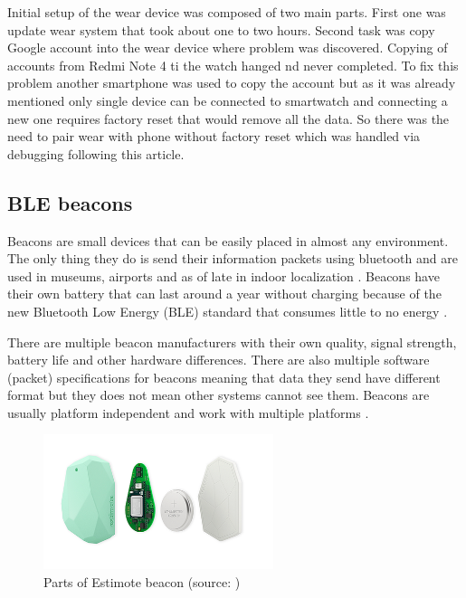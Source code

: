 Initial setup of the wear device was composed of two main parts. First one was update wear system that took about one to two hours. Second task was copy Google account into the wear device where problem was discovered. Copying of accounts from Redmi Note 4 ti the watch hanged nd never completed. To fix this problem another smartphone was used to copy the account but as it was already mentioned only single device can be connected to smartwatch and connecting a new one requires factory reset that would remove all the data. So there was the need to pair wear with phone without factory reset which was handled via debugging following this \cite{HtPAWW} article.

\subsection{BLE beacons}\label{subsec:BLEBeacons}
Beacons are small devices that can be easily placed in almost any environment. The only thing they do is send their information packets using bluetooth and are used in museums, airports and as of late in indoor localization \cite{10TABB}. Beacons have their own battery that can last around a year without charging because of the new Bluetooth Low Energy (BLE) standard that consumes little to no energy \cite{IPSBOBLE}. 

There are multiple beacon manufacturers with their own quality, signal strength, battery life and other hardware differences. There are also multiple software (packet) specifications for beacons meaning that data they send have different format but they does not mean other systems cannot see them. Beacons are usually platform independent and work with multiple platforms \cite{IPSBOBLE, 10TABB}.

\begin{figure}[H]
	\begin{centering}
		\includegraphics[width=0.6\textwidth]{img/estimote_beacon}
		\par\end{centering}
	\caption{Parts of Estimote beacon (source: \cite{RMPFEB})\label{fig:PartsOfEstimoteBeacon}}
	\label{fig10}
\end{figure}

